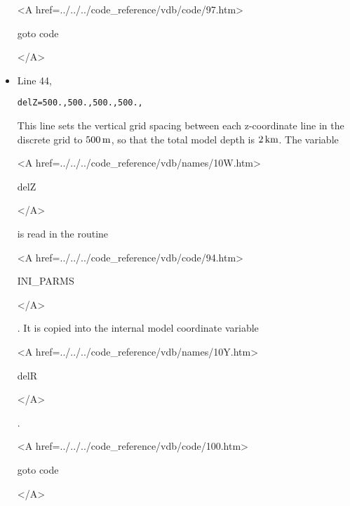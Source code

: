 \begin{itemize}
{\bf
\begin{rawhtml} <A href=../../../code_reference/vdb/code/97.htm> \end{rawhtml}
goto code
\begin{rawhtml} </A>\end{rawhtml}
}

\item Line 44,
\begin{verbatim}
delZ=500.,500.,500.,500.,
\end{verbatim}
This line sets the vertical grid spacing between each z-coordinate line
in the discrete grid to $500\,{\rm m}$, so that the total model depth 
is $2\,{\rm km}$.
The variable
{\bf
\begin{rawhtml} <A href=../../../code_reference/vdb/names/10W.htm> \end{rawhtml}
delZ
\begin{rawhtml} </A>\end{rawhtml}
}
is read in the routine
{\it
\begin{rawhtml} <A href=../../../code_reference/vdb/code/94.htm> \end{rawhtml}
INI\_PARMS
\begin{rawhtml} </A>\end{rawhtml}
}.
It is copied into the internal
model coordinate variable 
{\bf 
\begin{rawhtml} <A href=../../../code_reference/vdb/names/10Y.htm> \end{rawhtml}
delR
\begin{rawhtml} </A>\end{rawhtml}
}. 

{\bf
\begin{rawhtml} <A href=../../../code_reference/vdb/code/100.htm> \end{rawhtml}
goto code
\begin{rawhtml} </A>\end{rawhtml}
}


\end{itemize}
